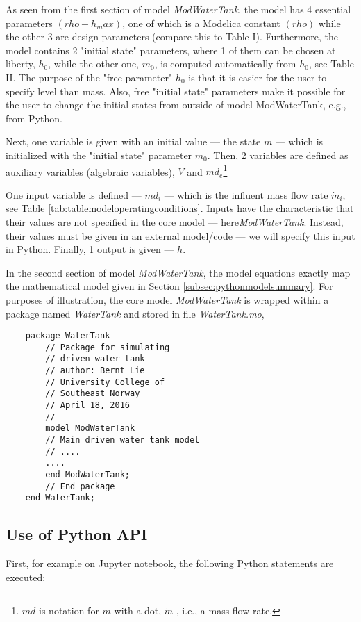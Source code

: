 As seen from the first section of model \textit{ModWaterTank}, the model has 4 essential parameters
$(rho-h_max)$, one of which is a Modelica constant $(rho)$ while the other 3 are design parameters (compare this
to Table I). Furthermore, the model contains 2 "initial state" parameters, where 1 of them can be chosen at
liberty, $h_0$, while the other one, $m_0$, is computed automatically from $h_0$, see Table II. The purpose of
the "free parameter" $h_0$ is that it is easier for the user to specify level than mass. Also, free "initial state"
parameters make it possible for the user to change the initial states from outside of model ModWaterTank, e.g., from Python.

Next, one variable is given with an initial value — the state $m$ — which is initialized with the "initial state" parameter
$m_0$. Then, 2 variables are defined as auxiliary variables (algebraic variables), $V$ and $md_e$\footnote{$md$ is notation for $m$ with a dot, $\dot{m}$ , i.e., a mass flow rate.}

One input variable is defined — $md_i$ — which is the influent mass flow rate $\dot{m}_i$, see Table \ref{tab:tablemodeloperatingconditions}. Inputs have the characteristic that their values are not specified in the core model — here\textit{ModWaterTank}. Instead,
their values must be given in an external model/code — we will specify this input in Python. Finally, 1 output is
given — $h$.

In the second section of model \textit{ModWaterTank}, the model equations exactly map the mathematical model
given in Section \ref{subsec:pythonmodelsummary}. For purposes of illustration, the core model \textit{ModWaterTank} is wrapped within a package named
\textit{WaterTank} and stored in file \textit{WaterTank.mo},


\begin{lstlisting}
	package WaterTank
		// Package for simulating
		// driven water tank
		// author: Bernt Lie
		// University College of
		// Southeast Norway
		// April 18, 2016
		//
		model ModWaterTank
		// Main driven water tank model
		// ....
		....
		end ModWaterTank;
		// End package
	end WaterTank;
\end{lstlisting}

\subsection{Use of Python API}
\label{subsec:pythonuseapi}

First, for example on Jupyter notebook, the following Python statements are executed:


